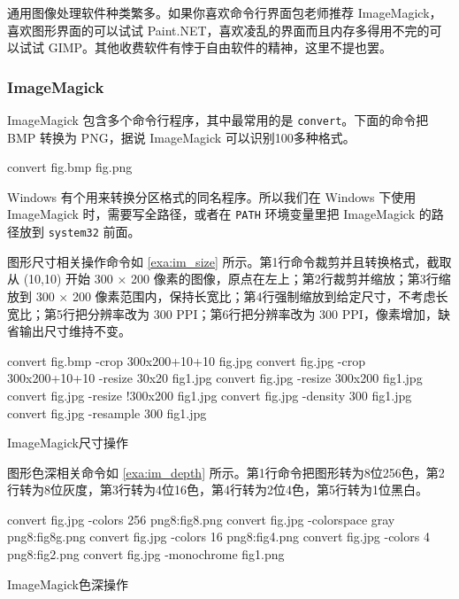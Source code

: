 通用图像处理软件种类繁多。如果你喜欢命令行界面包老师推荐 ImageMagick，喜欢图形界面的可以试试 Paint.NET，喜欢凌乱的界面而且内存多得用不完的可以试试 GIMP。其他收费软件有悖于自由软件的精神，这里不提也罢。

\subsubsection{ImageMagick}

ImageMagick 包含多个命令行程序，其中最常用的是 \texttt{convert}。下面的命令把 BMP 转换为 PNG，据说 ImageMagick 可以识别100多种格式。

\begin{Code}[]
convert fig.bmp fig.png 
\end{Code}

Windows 有个用来转换分区格式的同名程序。所以我们在 Windows 下使用 ImageMagick 时，需要写全路径，或者在 \texttt{PATH} 环境变量里把 ImageMagick 的路径放到 \texttt{system32} 前面。

图形尺寸相关操作命令如 \autoref{exa:im_size} 所示。第1行命令裁剪并且转换格式，截取从 (10,10) 开始 300 × 200 像素的图像，原点在左上；第2行裁剪并缩放；第3行缩放到 300 × 200 像素范围内，保持长宽比；第4行强制缩放到给定尺寸，不考虑长宽比；第5行把分辨率改为 300 PPI；第6行把分辨率改为 300 PPI，像素增加，缺省输出尺寸维持不变。

\begin{example}[h]
\begin{Code}[numbers=left]
convert fig.bmp -crop 300x200+10+10 fig.jpg
convert fig.jpg -crop 300x200+10+10 -resize 30x20 fig1.jpg
convert fig.jpg -resize 300x200 fig1.jpg
convert fig.jpg -resize !300x200 fig1.jpg
convert fig.jpg -density 300 fig1.jpg
convert fig.jpg -resample 300 fig1.jpg
\end{Code}
\caption{ImageMagick尺寸操作}
\label{exa:im_size}
\end{example}

图形色深相关命令如 \autoref{exa:im_depth} 所示。第1行命令把图形转为8位256色，第2行转为8位灰度，第3行转为4位16色，第4行转为2位4色，第5行转为1位黑白。

\begin{example}[h]
\begin{Code}[numbers=left]
convert fig.jpg -colors 256 png8:fig8.png
convert fig.jpg -colorspace gray png8:fig8g.png
convert fig.jpg -colors 16 png8:fig4.png
convert fig.jpg -colors 4 png8:fig2.png
convert fig.jpg -monochrome fig1.png
\end{Code}
\caption{ImageMagick色深操作}
\label{exa:im_depth}
\end{example}


